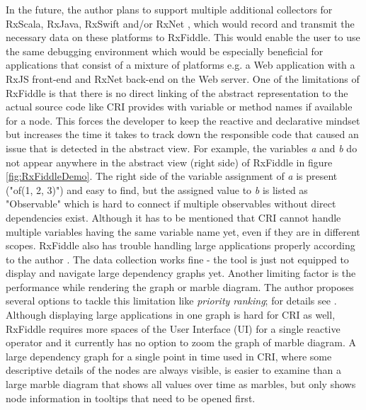 	In the future, the author plans to support multiple additional collectors for RxScala, RxJava, RxSwift and/or RxNet \cite{RxFiddleTutorials}, which would record and transmit the necessary data on these platforms to RxFiddle. This would enable the user to use the same debugging environment which would be especially beneficial for applications that consist of a mixture of platforms e.g. a Web application with a RxJS front-end and RxNet back-end on the Web server.
	One of the limitations of RxFiddle is that there is no direct linking of the abstract representation to the actual source code like CRI provides with variable or method names if available for a node. This forces the developer to keep the reactive and declarative mindset but increases the time it takes to track down the responsible code that caused an issue that is detected in the abstract view. For example, the variables \emph{a} and \emph{b} do not appear anywhere in the abstract view (right side) of RxFiddle in figure \ref{fig:RxFiddleDemo}. The right side of the variable assignment of \emph{a} is present ("of(1, 2, 3)") and easy to find, but the assigned value to \emph{b} is listed as "Observable" which is hard to connect if multiple observables without direct dependencies exist. Although it has to be mentioned that CRI cannot handle multiple variables having the same variable name yet, even if they are in different scopes.
	RxFiddle also has trouble handling large applications properly according to the author \cite[Issue 6]{RxFiddleGitHub}. The data collection works fine - the tool is just not equipped to display and navigate large dependency graphs yet. Another limiting factor is the performance while rendering the graph or marble diagram. The author proposes several options to tackle this limitation like \emph{priority ranking}; for details see \cite[Issue 6]{RxFiddleGitHub}. Although displaying large applications in one graph is hard for CRI as well, RxFiddle requires more spaces of the User Interface (UI) for a single reactive operator and it currently has no option to zoom the graph of marble diagram. A large dependency graph for a single point in time used in CRI, where some descriptive details of the nodes are always visible, is easier to examine than a large marble diagram that shows all values over time as marbles, but only shows node information in tooltips that need to be opened first.
